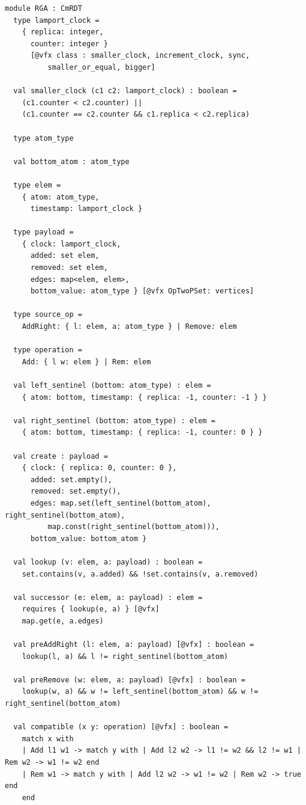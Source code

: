 \begin{lstlisting}[caption={\texttt{RGA}}, label={lst:app_rga}]
module RGA : CmRDT
  type lamport_clock =
    { replica: integer,
      counter: integer }
      [@vfx class : smaller_clock, increment_clock, sync,
          smaller_or_equal, bigger]

  val smaller_clock (c1 c2: lamport_clock) : boolean =
    (c1.counter < c2.counter) ||
    (c1.counter == c2.counter && c1.replica < c2.replica)

  type atom_type

  val bottom_atom : atom_type

  type elem =
    { atom: atom_type,
      timestamp: lamport_clock }

  type payload =
    { clock: lamport_clock,
      added: set elem,
      removed: set elem,
      edges: map<elem, elem>,
      bottom_value: atom_type } [@vfx OpTwoPSet: vertices]

  type source_op =
    AddRight: { l: elem, a: atom_type } | Remove: elem

  type operation =
    Add: { l w: elem } | Rem: elem

  val left_sentinel (bottom: atom_type) : elem =
    { atom: bottom, timestamp: { replica: -1, counter: -1 } }

  val right_sentinel (bottom: atom_type) : elem =
    { atom: bottom, timestamp: { replica: -1, counter: 0 } }

  val create : payload =
    { clock: { replica: 0, counter: 0 },
      added: set.empty(),
      removed: set.empty(),
      edges: map.set(left_sentinel(bottom_atom), right_sentinel(bottom_atom),
          map.const(right_sentinel(bottom_atom))),
      bottom_value: bottom_atom }

  val lookup (v: elem, a: payload) : boolean =
    set.contains(v, a.added) && !set.contains(v, a.removed)

  val successor (e: elem, a: payload) : elem =
    requires { lookup(e, a) } [@vfx]
    map.get(e, a.edges)

  val preAddRight (l: elem, a: payload) [@vfx] : boolean =
    lookup(l, a) && l != right_sentinel(bottom_atom)

  val preRemove (w: elem, a: payload) [@vfx] : boolean =
    lookup(w, a) && w != left_sentinel(bottom_atom) && w != right_sentinel(bottom_atom)

  val compatible (x y: operation) [@vfx] : boolean =
    match x with
    | Add l1 w1 -> match y with | Add l2 w2 -> l1 != w2 && l2 != w1 | Rem w2 -> w1 != w2 end
    | Rem w1 -> match y with | Add l2 w2 -> w1 != w2 | Rem w2 -> true end
    end


\end{lstlisting}

